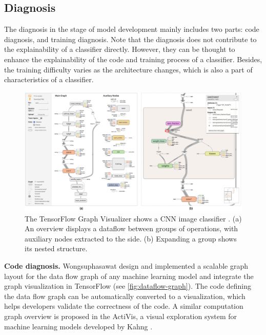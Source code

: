 \subsection{Diagnosis}

The diagnosis in the stage of model development mainly includes two parts: code diagnosis, and training diagnosis. Note that the diagnosis does not contribute to the explainability of a classifier directly. However, they can be thought to enhance the explainability of the code and training process of a classifier. Besides, the training difficulty varies as the architecture changes, which is also a part of characteristics of a classifier.

\begin{figure}
    \centering
    \includegraphics[width=1.0\textwidth]{figure/dataflow-graph}
    \caption{The TensorFlow Graph Visualizer shows a CNN image classifier \cite{wongsuphasawat2017dataflow}. (a) An overview displays a dataflow between groups of operations, with auxiliary nodes extracted to the side. (b) Expanding a group shows its nested structure.}
    \label{fig:dataflow-graph}
\end{figure}

\textbf{Code diagnosis.} Wongsuphasawat \etal \cite{wongsuphasawat2017dataflow} design and implemented a scalable graph layout for the data flow graph of any machine learning model and integrate the graph visualization in TensorFlow (see \autoref{fig:dataflow-graph}). The code defining the data flow graph can be automatically converted to a visualization, which helps developers validate the correctness of the code. A similar computation graph overview is proposed in the ActiVis, a visual exploration system for machine learning models developed by Kahng \etal \cite{kahng2017activis}.


